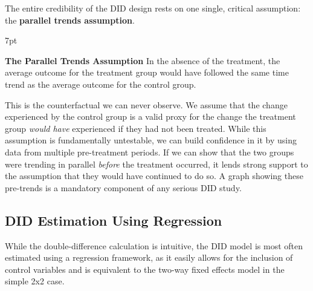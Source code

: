 \documentclass{article}
\newenvironment{redblock}{
\def\FrameCommand{
  \hspace{1pt}
    {\color{LightCoral}
    \vrule width 2pt}
    {\color{redshade}
    \vrule width 4pt}
  \colorbox{redshade}
}
\MakeFramed{
  \advance
  \hsize-
  \width
  \FrameRestore}
\noindent\hspace{-4.55pt}%
\begin{adjustwidth}{}{7pt}
\vspace{2pt}\vspace{2pt}
}
{\vspace{2pt}\end{adjustwidth}\endMakeFramed}
\begin{document}
The entire credibility of the DID design rests on one single, critical assumption: the \textbf{parallel trends assumption}.

\begin{redblock}
\textbf{The Parallel Trends Assumption}
In the absence of the treatment, the average outcome for the treatment group would have followed the same time trend as the average outcome for the control group.
\end{redblock}

This is the counterfactual we can never observe. We assume that the change experienced by the control group is a valid proxy for the change the treatment group \textit{would have} experienced if they had not been treated. While this assumption is fundamentally untestable, we can build confidence in it by using data from multiple pre-treatment periods. If we can show that the two groups were trending in parallel \textit{before} the treatment occurred, it lends strong support to the assumption that they would have continued to do so. A graph showing these pre-trends is a mandatory component of any serious DID study.

\subsection{DID Estimation Using Regression}
\label{sub:did_regression}

While the double-difference calculation is intuitive, the DID model is most often estimated using a regression framework, as it easily allows for the inclusion of control variables and is equivalent to the two-way fixed effects model in the simple 2x2 case.
\end{document}
